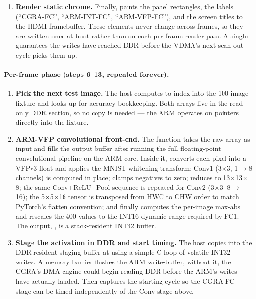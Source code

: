 \begin{enumerate}[leftmargin=2.1em, label=\textbf{Step \arabic*.},
                  itemsep=4pt, topsep=2pt]
\item \textbf{Render static chrome.} Finally, 
paints the panel rectangles, the labels (``CGRA-FC'', ``ARM-INT-FC'',
``ARM-VFP-FC''), and the screen titles to the HDMI framebuffer. These
elements never change across frames, so they are written once at boot
rather than on each per-frame render pass. A single 
guarantees the writes have reached DDR before the VDMA's next scan-out
cycle picks them up.
\end{enumerate}

\paragraph{Per-frame phase (steps 6--13, repeated forever).}
\begin{enumerate}[leftmargin=2.1em, label=\textbf{Step \arabic*.}, start=6,
                  itemsep=4pt, topsep=2pt]
\item \textbf{Pick the next test image.} The host computes
 to index into the 100-image
fixture and looks up  for accuracy
bookkeeping. Both arrays live in the read-only 
DDR section, so no copy is needed --- the ARM operates on
pointers directly into the fixture.

\item \textbf{ARM-VFP convolutional front-end.} The function
 takes the raw 
array as input and fills the output buffer  after
running the full floating-point convolutional pipeline on the ARM
core. Inside it,
 converts each  pixel into a
VFPv3 float and applies the MNIST whitening transform; Conv1
(3$\times$3, 1$\to$8 channels) is computed in place; 
clamps negatives to zero;  reduces to 13$\times$13$\times$8;
the same Conv$+$ReLU$+$Pool sequence is repeated for Conv2 (3$\times$3,
8$\to$16); the 5$\times$5$\times$16 tensor is transposed from HWC to CHW order
to match PyTorch's flatten convention; and finally
 computes the per-image max-abs and
rescales the 400 values to the INT16 dynamic range required by FC1.
The output, , is a stack-resident INT32 buffer.

\item \textbf{Stage the activation in DDR and start timing.} The host
copies  into the DDR-resident staging buffer at
 using a simple C loop of volatile
INT32 writes. A  memory barrier flushes the ARM
write-buffer; without it, the CGRA's DMA engine could begin reading
DDR before the ARM's writes have actually landed. Then
 captures the starting cycle so the
CGRA-FC stage can be timed independently of the Conv stage above.


\end{enumerate}
